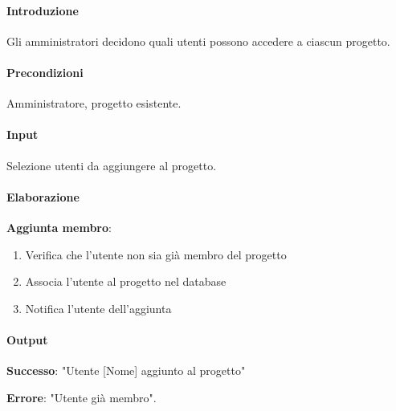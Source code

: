\newpage


\begin{reqbox}[title=REQ-FUN-07: Aggiungi Membri Progetto (solo Admin)]
\label{subsubsec:req-gestisci-membri}

\paragraph{Introduzione}
Gli amministratori decidono quali utenti possono accedere a ciascun progetto.

\paragraph{Precondizioni}
Amministratore, progetto esistente.

\paragraph{Input}
Selezione utenti da aggiungere al progetto.

\paragraph{Elaborazione}

\textbf{Aggiunta membro}:
\begin{enumerate}[leftmargin=1.1em]
\item Verifica che l'utente non sia già membro del progetto
\item Associa l'utente al progetto nel database
\item Notifica l'utente dell'aggiunta
\end{enumerate}

\paragraph{Output}
\textbf{Successo}: "Utente [Nome] aggiunto al progetto"

\textbf{Errore}: "Utente già membro".

\end{reqbox}

\vspace{0.5cm}

\newpage



